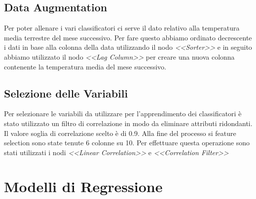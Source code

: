 \documentclass[10pt, a4paper, twocolumn]{article} %
\begin{document}
\subsection{Data Augmentation}
Per poter allenare i vari classificatori ci serve il dato relativo alla temperatura media terrestre del mese successivo. Per fare questo abbiamo ordinato decrescente i dati in base alla colonna della data utilizzando il nodo \textit{<<Sorter>>} e in seguito abbiamo utilizzato il nodo \textit{<<Lag Column>>} per creare una nuova colonna contenente la temperatura media del mese successivo.

\subsection{Selezione delle Variabili}
Per selezionare le variabili da utilizzare per l'apprendimento dei classificatori è stato utilizzato un filtro di correlazione in modo da eliminare attributi ridondanti. Il valore soglia di correlazione scelto è di 0.9. Alla fine del processo si feature selection sono state tenute 6 colonne su 10. Per effettuare questa operazione sono stati utilizzati i nodi \textit{<<Linear Correlation>>} e \textit{<<Correlation Filter>>}
\section{Modelli di Regressione}

\printbibliography[title={Bibliography}] %

\end{document}
